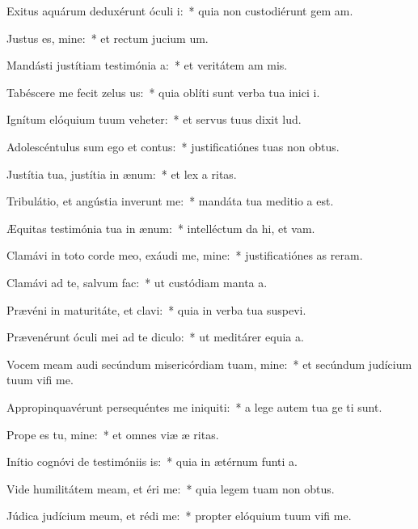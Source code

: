 \item Exitus aquárum deduxérunt óculi i:~* quia non custodiérunt gem am.
\item Justus es, mine:~* et rectum jucium um.
\item Mandásti justítiam testimónia a:~* et veritátem am mis.
\item Tabéscere me fecit zelus us:~* quia oblíti sunt verba tua inici i.
\item Ignítum elóquium tuum veheter:~* et servus tuus dixit lud.
\item Adolescéntulus sum ego et contus:~* justificatiónes tuas non  obtus.
\item Justítia tua, justítia in ænum:~* et lex a ritas.
\item Tribulátio, et angústia inverunt me:~* mandáta tua meditio a est.
\item Æquitas testimónia tua in ænum:~* intelléctum da hi, et vam.
\item Clamávi in toto corde meo, exáudi me, mine:~* justificatiónes as reram.
\item Clamávi ad te, salvum  fac:~* ut custódiam manta a.
\item Prævéni in maturitáte, et clavi:~* quia in verba tua suspevi.
\item Prævenérunt óculi mei ad te diculo:~* ut meditárer equia a.
\item Vocem meam audi secúndum misericórdiam tuam, mine:~* et secúndum judícium tuum vifi me.
\item Appropinquavérunt persequéntes me iniquiti:~* a lege autem tua ge ti sunt.
\item Prope es tu, mine:~* et omnes viæ æ ritas.
\item Inítio cognóvi de testimóniis is:~* quia in ætérnum funti a.
\item Vide humilitátem meam, et éri me:~* quia legem tuam non  obtus.
\item Júdica judícium meum, et rédi me:~* propter elóquium tuum vifi me.
